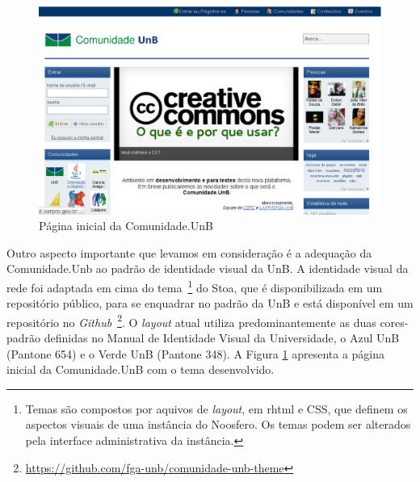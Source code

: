 \begin{figure}[h]
    \centering
    \includegraphics[keepaspectratio=true,scale=0.4]
      {figuras/comunidade.unb.br.eps}
    \caption{Página inicial da Comunidade.UnB}
    \label{comunidade-unb}
\end{figure}

Outro aspecto importante que levamos em consideração é a adequação da
Comunidade.Unb ao padrão de identidade visual da UnB.
A identidade visual da rede foi adaptada em cima do tema~\footnote{Temas são
compostos por aquivos de \textit{layout}, em rhtml e CSS, que definem os aspectos
visuais de uma instância do Noosfero. Os temas podem ser alterados pela interface
administrativa da instância.} do Stoa, que é disponibilizada em um repositório
público, para se enquadrar no padrão da UnB e está disponível em um repositório
no \textit{Github}~\footnote{\url{https://github.com/fga-unb/comunidade-unb-theme}}.
%
O \textit{layout} atual utiliza predominantemente as duas cores-padrão definidas
no Manual de Identidade Visual da Universidade\cite{visualUnB}, o Azul UnB
(Pantone 654) e o Verde UnB (Pantone 348). A Figura \ref{comunidade-unb}
apresenta a página inicial da Comunidade.UnB com o tema desenvolvido.
